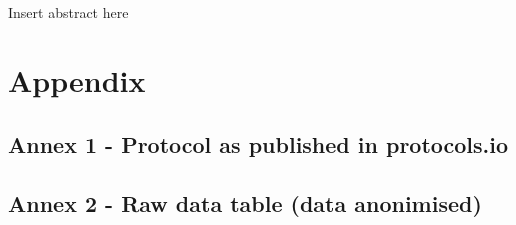 \documentclass[fontsize=12pt,twoside=semi,openright,numbers=noenddot,parskip=half]{scrbook}
\begin{document}
\paragraph{}Insert abstract here
\mainmatter\printindex\tableofcontents


%
%
%
%
\backmatter{}\setcounter{page}{0}

\clearpage
\printbibliography[title={References}]
\cleardoublepage\part{Appendix}\appendix
\chapter{Annex 1 - Protocol as published in protocols.io}

\clearpage\appendix\chapter{Annex 2 - Raw data table (data anonimised)}

%
\end{document}

